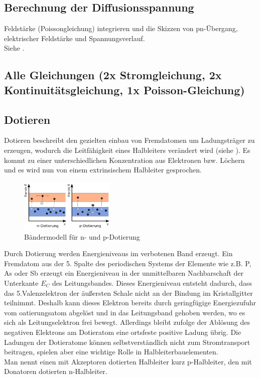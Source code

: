 
\subsection{Berechnung der Diffusionsspannung }\label{k3:diffusion}
Feldst\"arke (Poissongleichung) integrieren und die Skizzen von pn-\"Ubergang, elektrischer
Feldst\"arke und Spannungsverlauf.\\
Siehe .

\subsection{Alle Gleichungen (2x Stromgleichung, 2x Kontinuitätsgleichung, 1x Poisson-Gleichung) }\label{k3:alleGleichungen}

\subsection{Dotieren }\label{k3:dotieren}
Dotieren beschreibt den gezielten einbau von Fremdatomen um Ladungstr\"ager zu erzeugen, wodurch die Leitf\"ahigkeit eines
Halbleiters ver\"andert wird (siehe ). Es kommt zu einer unterschiedlichen Konzentration aus Elektronen bzw. L\"ochern und es wird
nun von einem extrinsischem Halbleiter gesprochen.\\
\begin{figure}[h]
    \centering
    \includegraphics[width=0.4\textwidth]{fig/dotieren}
    \caption{B\"andermodell für n- und p-Dotierung}
    \label{fig:dotieren}
\end{figure}
Durch Dotierung werden Energieniveaus im verbotenen Band erzeugt. Ein Fremdatom aus der 5. Spalte des periodischen Systems
der Elemente wie z.B. P, As oder Sb erzeugt ein Energieniveau in der unmittelbaren Nachbarschaft der Unterkante $E_C$ des
Leitungsbandes. Dieses Energieniveau entsteht dadurch, dass das 5.Valenzelektron der äußersten Schale nicht an der
Bindung im Kristallgitter teilnimmt. Deshalb kann dieses Elektron bereits durch geringfügige Energiezufuhr vom oatierungsatom
abgelöst und in das Leitungsband gehoben werden, wo es sich als Leitungselektron frei bewegt.
Allerdings bleibt zufolge der Ablösung des negativen Elektrons am Dotieratom eine ortsfeste positive Ladung übrig. Die
Ladungen der Dotieratome können selbstverständlich nicht zum Stromtransport beitragen, spielen aber eine wichtige Rolle in
Halbleiterbauelementen.\\
Man nennt einen mit Akzeptoren dotierten Halbleiter kurz p-Halbleiter, den mit Donatoren dotierten n-Halbleiter.

